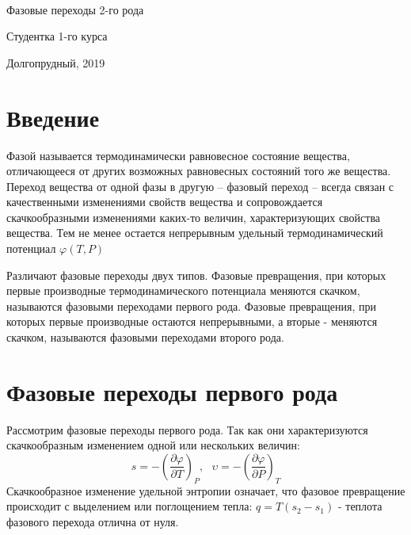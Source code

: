 \documentclass[a4paper,12pt]{article}
\date{\today}
\begin{document}
\begin{titlepage}
\
\vspace{20em}

\begin{center}
\Large Фазовые переходы 2-го рода
\end{center}

\vspace{22em}

\begin{flushright}
Студентка 1-го курса \\


\end{flushright}

\vspace{\fill}

\begin{center}
Долгопрудный, 2019
\end{center}
\end{titlepage}
\newpage
\tableofcontents 
\newpage

\section{Введение}
Фазой называется термодинамически равновесное состояние вещества, отличающееся от других возможных равновесных состояний того же вещества. 
Переход вещества от одной фазы в другую – фазовый переход – всегда связан с качественными изменениями свойств вещества и сопровождается скачкообразными изменениями каких-то величин, характеризующих свойства вещества. Тем не менее остается непрерывным удельный термодинамический потенциал $\varphi(T, P)$ 

Различают фазовые переходы двух типов. Фазовые превращения, при которых первые производные термодинамического потенциала меняются скачком, называются фазовыми переходами первого рода. Фазовые превращения, при которых первые производные остаются непрерывными, а вторые - меняются скачком, называются фазовыми переходами второго рода.\\


\section{Фазовые переходы первого рода}
Рассмотрим фазовые переходы первого рода. Так как они характеризуются скачкообразным изменением одной или нескольких величин:
\[s = -\left(\frac{\partial \varphi}{\partial T}\right)_P, \ \ \ \upsilon = -\left(\frac{\partial \varphi}{\partial P}\right)_T\]
Скачкообразное изменение удельной энтропии означает, что фазовое превращение происходит с выделением или поглощением тепла: $q = T(s_2 - s_1)$ - теплота фазового перехода отлична от нуля.\\
\end{document}
